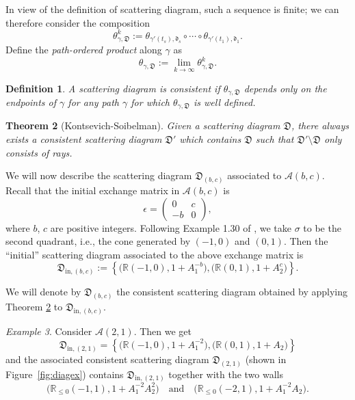 \documentclass[11pt]{amsart}
\newtheorem{theorem}{Theorem}[section]
\newtheorem{defn}[theorem]{Definition}
\theoremstyle{remark}
\newtheorem{example}[theorem]{Example}
\numberwithin{equation}{section}
\newcommand{\RR}{\mathbb{R}}
\newcommand{\cA}{\mathcal{A}}
\newcommand{\fd}{\mathfrak{d}}
\newcommand{\fD}{\mathfrak{D}}
\begin{document}
In view of the definition of scattering diagram, such a sequence is finite; we
can therefore consider the composition 
\[
  \theta^k_{\gamma, \fD} :=
  \theta_{\gamma'(t_s),\fd_s} \circ \cdots \circ \theta_{\gamma'(t_1),\fd_1}.
\]
Define the \textit{path-ordered product} along $\gamma$ as
\[
  \theta_{\gamma, \fD} := \lim_{k \rightarrow \infty} \theta ^k_{\gamma, \fD}. 
\]

\begin{defn}
  A scattering diagram is \emph{consistent} if $\theta _{\gamma, \fD}$ depends
  only on the endpoints of $\gamma$ for any path $\gamma$ for which
  $\theta_{\gamma, \fD}$ is well defined.
\end{defn}

\begin{theorem}[Kontsevich-Soibelman] 
  \label{KS}
  Given a scattering diagram $\fD$, there always exists a consistent scattering
  diagram $\fD'$ which contains $\fD$ such that $\fD'\setminus\fD$ only consists
  of rays.
\end{theorem}

We will now describe the scattering diagram $\fD_{(b,c)}$ associated to 
$\cA(b,c)$.
Recall that the initial exchange matrix in $\cA(b,c)$ is 
\[
  \epsilon = \begin{pmatrix} 0 & c\\ -b & 0\end{pmatrix},
\]
where $b$, $c$ are positive integers.  Following Example 1.30 of \cite{GHKK}, we
take $\sigma$ to be the second quadrant, i.e., the cone generated by $(-1,0)$ and
$(0,1)$. Then the ``initial'' scattering diagram associated to the above exchange
matrix is
\[
  \fD_{\mathrm{in},(b,c)} := 
  \left\{
    \big( \RR (-1,0), 1+A_1^{-b}\big), 
    \big( \RR (0,1), 1+A_2^c\big) 
  \right\}.
\]

We will denote by $\fD_{(b,c)}$ the consistent scattering diagram obtained by
applying Theorem \ref{KS} to $\fD_{\mathrm{in},(b,c)}$.

\begin{example} 
  \label{ex}
  Consider $\cA(2,1)$. Then we get
  \[
    \fD_{\mathrm{in},(2,1)} =  
    \left\{ 
      \big(\RR (-1,0), 1+A_1^{-2}\big), 
      \big(\RR (0,1), 1+A_2\big)  
    \right\}   
  \]
  and the associated consistent scattering diagram $\fD_{(2,1)}$ (shown in
  Figure~\ref{fig:diagex}) contains $\fD_{\mathrm{in},(2,1)}$ together with
  the two walls
  \[ 
    \big( \RR_{\leq 0} (-1,1), 1+A_1^{-2}A_2^2 \big)
    \quad \mbox{and} \quad
    \big( \RR_{\leq 0} (-2,1), 1+A_1^{-2}A_2 \big).
  \]
\end{example}
\end{document}
